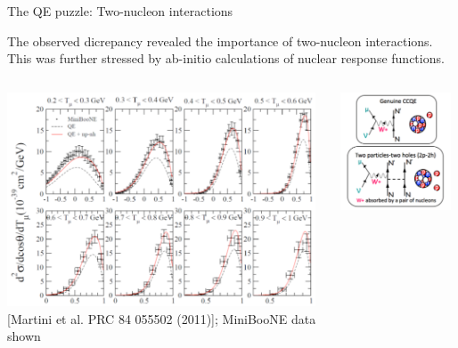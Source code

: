 %
%
%
\begin{frame}{The QE puzzle: Two-nucleon interactions}

{\small
 The observed dicrepancy revealed the {\color{cadmiumred}importance of two-nucleon interactions}.
 This was further stressed by ab-initio calculations of nuclear response functions.
}

  \begin{columns}
    \begin{column}{0.70\textwidth}
      \begin{center}
        \includegraphics[width=0.98\textwidth]{./images/nuint/ccqe/martini_2p2h.png}\\
        {\scriptsize [Martini et al. PRC 84 055502 (2011)]; MiniBooNE data shown}
      \end{center}
    \end{column}
    \begin{column}{0.30\textwidth}
     \begin{center}
        \includegraphics[width=0.95\textwidth]{./images/nuint/feyn/2p2h_diagrams_2.png}\\

\end{center}
\end{column}
\end{columns}
\end{frame}
